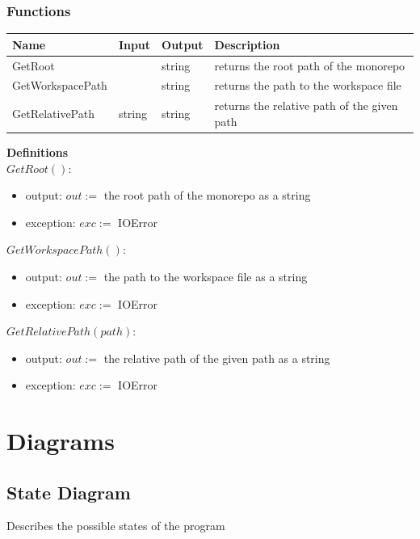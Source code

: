 \documentclass[11pt]{article}
\begin{document}
\subsubsection{Functions}
\begin{tabular}{l | l | l | p{7cm} }
  \textbf{Name} & \textbf{Input} & \textbf{Output} & \textbf{Description} \\
  \hline
  GetRoot &  & string & returns the root path of the monorepo\\
  \hline
  GetWorkspacePath &  & string & returns the path to the workspace file\\
  \hline
  GetRelativePath & string & string & returns the relative path of the given path\\
\end{tabular}

\vspace{2em}
\textbf{Definitions}\\

$GetRoot():$
\begin{itemize}
\item output: $out :=$ the root path of the monorepo as a string
\item exception: $exc :=$ IOError
\end{itemize}

$GetWorkspacePath():$
\begin{itemize}
\item output: $out :=$ the path to the workspace file as a string
\item  exception: $exc :=$ IOError
\end{itemize}

$GetRelativePath(path):$
\begin{itemize}
\item output: $out :=$ the relative path of the given path as a string
\item exception: $exc :=$ IOError
\end{itemize}


\newpage
\section{Diagrams}
\label{sec:diagrams}

\subsection{State Diagram}
Describes the possible states of the program
\end{document}
